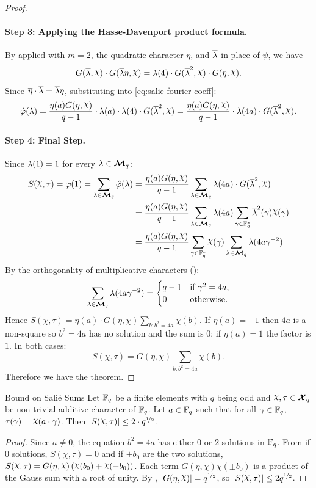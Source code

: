 \begin{proof}
  \paragraph*{Step 3: Applying the Hasse-Davenport product formula.} By \DHRelation applied with $m=2$, the quadratic character $\eta$, and $\overline{\lambda}$ in place of $\psi$, we have
  $$G(\ov\lm,\chi)\cdot G(\ov\lm\eta,\chi)=\lm(4)\cdot G(\ov\lm^2,\chi)\cdot G(\eta,\chi).$$
  Since $\overline{\eta}\cdot\overline{\lambda}=\overline{\lambda}\eta$, substituting into \eqref{eq:salie-fourier-coeff}:
  $$\hat\varphi(\lm)=\frac{\eta(a)G(\eta,\chi)}{q-1}\cdot\lm(a)\cdot\lm(4)\cdot G(\ov\lm^2,\chi)=\frac{\eta(a)G(\eta,\chi)}{q-1}\cdot\lm(4a)\cdot G(\ov\lm^2,\chi).$$

  \paragraph*{Step 4: Final Step.} Since $\lambda(1)=1$ for every $\lambda\in\boldsymbol{\mathcal{M}}_q$:
  \begin{align*}
    S(\chi,\tau)=\varphi(1)=\sum_{\lm\in\Mq}\hat\varphi(\lm)&=\frac{\eta(a)G(\eta,\chi)}{q-1}\sum_{\lm\in\Mq}\lm(4a)\cdot G(\ov\lm^2,\chi)\\
    &=\frac{\eta(a)G(\eta,\chi)}{q-1}\sum_{\lm\in\Mq}\lm(4a)\sum_{\gm\in\bbF_q^*}\ov\lm^2(\gm)\chi(\gm)\\ 
    &=\frac{\eta(a)G(\eta,\chi)}{q-1}\sum_{\gm\in\bbF_q^*}\chi(\gm)\sum_{\lm\in\Mq}\lm(4a\gm^{-2})
  \end{align*}
  By the orthogonality of multiplicative characters (\MultCharPropsthm[(ii)]):
  $$\sum_{\lambda\in\boldsymbol{\mathcal{M}}_q}\lambda(4a\gamma^{-2})=\begin{cases}q-1&\text{if }\gamma^2=4a,\\0&\text{otherwise.}\end{cases}$$
  Hence $S(\chi,\tau)=\eta(a)\cdot G(\eta,\chi)\sum_{b:b^2=4a}\chi(b)$. If $\eta(a)=-1$ then $4a$ is a non-square so $b^2=4a$ has no solution and the sum is $0$; if $\eta(a)=1$ the factor is $1$. In both cases:
  $$S(\chi,\tau)=G(\eta,\chi)\sum_{b\colon b^2=4a}\chi(b).$$Therefore we have the theorem. 
\end{proof}
\begin{lemma}{Bound on Sali\'{e} Sums}{}
  Let $\mathbb{F}_q$ be a finite elements with $q$ being odd and $\chi,\tau\in\Xq$ be non-trivial additive character of $\mathbb{F}_q$. Let $a\in\mathbb{F}_q$ such that for all $\gamma\in\mathbb{F}_q$, $\tau(\gm)=\chi(a\cdot \gm)$. Then $|S(\chi,\tau)|\leq 2\cdot q^{\nicefrac12}$. 
\end{lemma}
\begin{proof}
  Since $a\neq 0$, the equation $b^2=4a$ has either $0$ or $2$ solutions in $\mathbb{F}_q$. From  if $0$ solutions, $S(\chi,\tau)=0$ and if $\pm b_0$ are the two solutions, $S(\chi,\tau)=G(\eta,\chi)\lt(\chi(b_0)+\chi(-b_0)\rt)$. Each term $G(\eta,\chi)\chi(\pm b_0)$ is a product of the Gauss sum with a root of unity. By \GSpropthm, $|G(\eta,\chi)|=q^{\nicefrac12}$, so $|S(\chi,\tau)|\leq 2q^{\nicefrac12}$.
\end{proof}